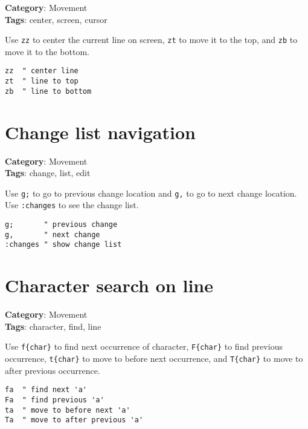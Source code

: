 {{{{{{{\textbf{Category}: Movement\\ \textbf{Tags}: center, screen, cursor
\vspace{0.5cm}

Use {\footnotesize \Verb§zz§} to center the current line on screen, {\footnotesize \Verb§zt§} to move it to the top, and {\footnotesize \Verb§zb§} to move it to the bottom.

\begin{Exa*}{}
\begin{Verbatim}[fontsize=\footnotesize, breaklines, breakanywhere]
zz  " center line
zt  " line to top
zb  " line to bottom
\end{Verbatim}
\end{Exa*}

\section{Change list navigation}

\textbf{Category}: Movement\\ \textbf{Tags}: change, list, edit
\vspace{0.5cm}

Use {\footnotesize \Verb§g;§} to go to previous change location and {\footnotesize \Verb§g,§} to go to next change location. Use {\footnotesize \Verb§:changes§} to see the change list.

\begin{Exa*}{}
\begin{Verbatim}[fontsize=\footnotesize, breaklines, breakanywhere]
g;       " previous change
g,       " next change
:changes " show change list
\end{Verbatim}
\end{Exa*}

\section{Character search on line}

\textbf{Category}: Movement\\ \textbf{Tags}: character, find, line
\vspace{0.5cm}

Use {\footnotesize \Verb§f{char}§} to find next occurrence of character, {\footnotesize \Verb§F{char}§} to find previous occurrence, {\footnotesize \Verb§t{char}§} to move to before next occurrence, and {\footnotesize \Verb§T{char}§} to move to after previous occurrence.

\begin{Exa*}{}
\begin{Verbatim}[fontsize=\footnotesize, breaklines, breakanywhere]
fa  " find next 'a'
Fa  " find previous 'a'
ta  " move to before next 'a'
Ta  " move to after previous 'a'
\end{Verbatim}
\end{Exa*}

}}}}}}}
